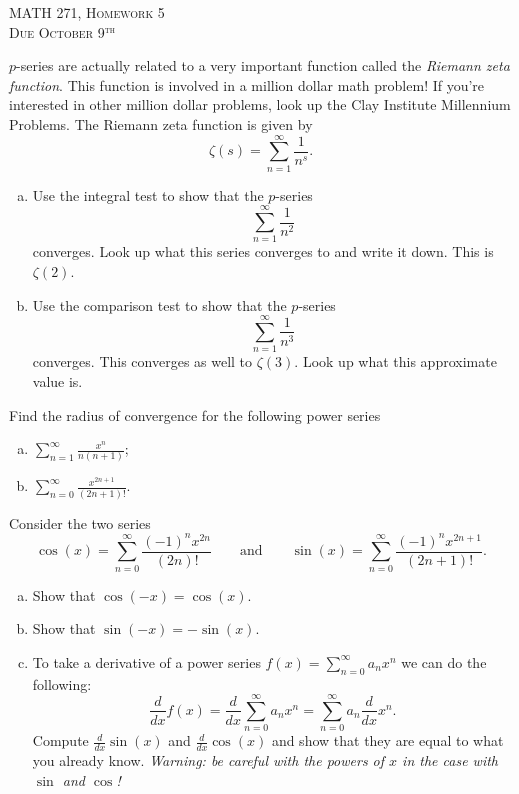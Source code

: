 \documentclass[12pt]{article} %
\begin{document}
\begin{center}
   \textsc{\large MATH 271, Homework 5}\\
   \textsc{Due October 9$^\textrm{th}$}
\end{center}
\vspace{.5cm}

\begin{problem} $p$-series are actually related to a very important function called the \emph{Riemann zeta function}.  This function is involved in a million dollar math problem! If you're interested in other million dollar problems, look up the Clay Institute Millennium Problems. The Riemann zeta function is given by
\[
\zeta (s) = \sum_{n=1}^\infty \frac{1}{n^s}.
\]
\begin{enumerate}[(a)]
    \item Use the integral test to show that the $p$-series
    \[
    \sum_{n=1}^\infty \frac{1}{n^2}
    \]
    converges.  Look up what this series converges to and write it down. This is $\zeta(2)$.
    \item Use the comparison test to show that the $p$-series
    \[
    \sum_{n=1}^\infty \frac{1}{n^3}
    \]
    converges. This converges as well to $\zeta(3)$. Look up what this approximate value is.
\end{enumerate}
\end{problem}

\begin{problem}
Find the radius of convergence for the following power series
\begin{enumerate}[(a)]
    \item $\displaystyle{\sum_{n=1}^\infty \frac{x^n}{n(n+1)}}$;
    \item $\displaystyle{\sum_{n=0}^\infty \frac{x^{2n+1}}{(2n+1)!}}$.
\end{enumerate}
\end{problem}

\begin{problem}
Consider the two series
\[
\cos(x) = \sum_{n=0}^\infty \frac{(-1)^n x^{2n}}{(2n)!} \qquad \textrm{and} \qquad \sin(x) = \sum_{n=0}^\infty \frac{(-1)^n x^{2n+1}}{(2n+1)!}.
\]
\begin{enumerate}[(a)]
    \item Show that $\cos(-x)=\cos(x)$.
    \item Show that $\sin(-x)=-\sin(x)$.
    \item To take a derivative of a power series $f(x) = \displaystyle{\sum_{n=0}^\infty a_n x^n}$ we can do the following: 
    \[
    \frac{d}{dx}f(x) = \frac{d}{dx} \sum_{n=0}^\infty a_n x^n = \sum_{n=0}^\infty a_n \frac{d}{dx} x^n.
    \]
    Compute $\frac{d}{dx} \sin(x)$ and $\frac{d}{dx} \cos(x)$ and show that they are equal to what you already know. \emph{Warning: be careful with the powers of $x$ in the case with $\sin$ and $\cos$!}
\end{enumerate}
\end{problem}
\end{document}
